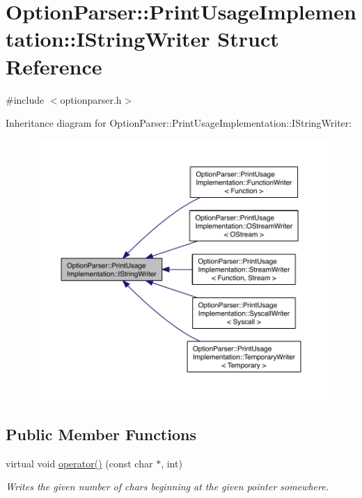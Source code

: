 \hypertarget{struct_option_parser_1_1_print_usage_implementation_1_1_i_string_writer}{\section{Option\-Parser\-:\-:Print\-Usage\-Implementation\-:\-:I\-String\-Writer Struct Reference}
\label{struct_option_parser_1_1_print_usage_implementation_1_1_i_string_writer}
}


{\ttfamily \#include $<$optionparser.\-h$>$}



Inheritance diagram for Option\-Parser\-:\-:Print\-Usage\-Implementation\-:\-:I\-String\-Writer\-:\nopagebreak
\begin{figure}[H]
\begin{center}
\leavevmode
\includegraphics[width=350pt]{struct_option_parser_1_1_print_usage_implementation_1_1_i_string_writer__inherit__graph}
\end{center}
\end{figure}
\subsection*{Public Member Functions}
\begin{DoxyCompactItemize}
\item 
virtual void \hyperlink{struct_option_parser_1_1_print_usage_implementation_1_1_i_string_writer_acae5e8911028920188394436f9712251}{operator()} (const char $\ast$, int)
\begin{DoxyCompactList}\small\item\em Writes the given number of chars beginning at the given pointer somewhere. \end{DoxyCompactList}\end{DoxyCompactItemize}


